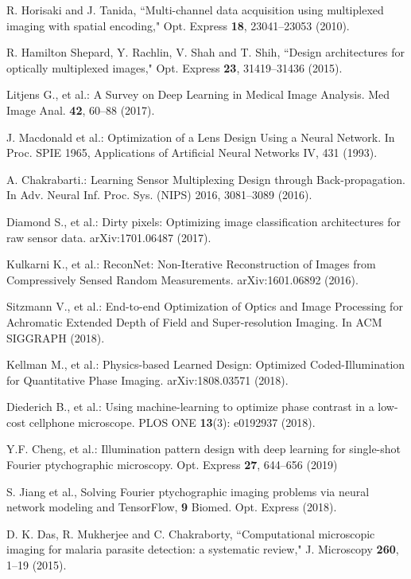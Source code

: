 \documentclass{article}
\begin{document}
\begin{thebibliography}{99}
 R. Horisaki and J. Tanida, ``Multi-channel data acquisition using multiplexed imaging with spatial encoding," Opt. Express {\bf 18}, 23041--23053 (2010).

 R. Hamilton Shepard, Y. Rachlin, V. Shah and T. Shih, ``Design architectures for optically multiplexed images," Opt. Express {\bf 23}, 31419--31436 (2015).

Litjens G., et al.: A Survey on Deep Learning in Medical Image Analysis. Med Image Anal. \textbf{42}, 60--88 (2017).

J. Macdonald et al.: Optimization of a Lens Design Using a Neural
Network. In Proc. SPIE 1965, Applications of Artificial Neural Networks IV, 431 (1993).

A. Chakrabarti.: Learning Sensor Multiplexing Design through Back-propagation. In Adv.
Neural Inf. Proc. Sys. (NIPS) 2016, 3081--3089 (2016).

Diamond S., et al.: Dirty pixels: Optimizing image
classification architectures for raw sensor data. arXiv:1701.06487 (2017).

Kulkarni K., et al.: ReconNet: Non-Iterative Reconstruction of Images from Compressively Sensed Random Measurements. arXiv:1601.06892 (2016).

Sitzmann V., et al.: End-to-end Optimization of Optics and Image Processing for Achromatic Extended Depth of Field and Super-resolution Imaging. In ACM SIGGRAPH (2018).

Kellman M., et al.: Physics-based Learned Design: Optimized Coded-Illumination for Quantitative Phase Imaging. arXiv:1808.03571 (2018).

Diederich B., et al.: Using machine-learning to optimize phase contrast in a low-cost cellphone microscope. PLOS ONE \textbf{13}(3): e0192937 (2018).

Y.F. Cheng, et al.: Illumination pattern design with deep learning for single-shot Fourier ptychographic microscopy. Opt. Express \textbf{27}, 644--656 (2019)

 S. Jiang et al., Solving Fourier ptychographic imaging problems via neural network modeling and TensorFlow, \textbf{9} Biomed. Opt. Express (2018).

 D. K. Das, R. Mukherjee and C. Chakraborty, ``Computational microscopic imaging for malaria parasite detection: a systematic review," J. Microscopy {\bf 260}, 1--19 (2015).

 \end{thebibliography}
 
\end{document}
